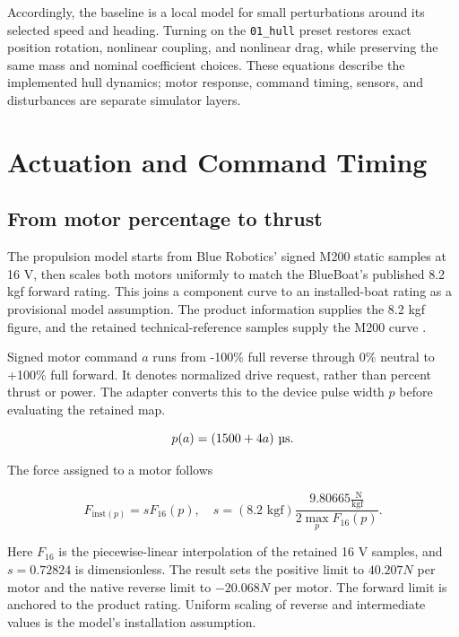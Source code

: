 \documentclass[10pt,letterpaper]{article}
\begin{document}
Accordingly, the baseline is a local model for small perturbations around its selected speed and heading. Turning on the \texttt{01\_hull} preset restores exact position rotation, nonlinear coupling, and nonlinear drag, while preserving the same mass and nominal coefficient choices. These equations describe the implemented hull dynamics; motor response, command timing, sensors, and disturbances are separate simulator layers.

\section{Actuation and Command Timing}\label{actuation-chapter}

\subsection{From motor percentage to thrust}

The propulsion model starts from Blue Robotics' signed M200 static samples at 16 V, then scales both motors uniformly to match the BlueBoat's published 8.2 kgf forward rating. This joins a component curve to an installed-boat rating as a provisional model assumption. The product information supplies the 8.2 kgf figure, and the retained technical-reference samples supply the M200 curve \cite{BlueRobotics2026M200Reference}\cite{BlueRobotics2026BlueBoatProduct}.

Signed motor command \(a\) runs from -100\% full reverse through 0\% neutral to +100\% full forward. It denotes normalized drive request, rather than percent thrust or power. The adapter converts this to the device pulse width \(p\) before evaluating the retained map.

\begin{equation}
p(a) = (1500 + 4a)\text{ \textmu{}s}.
\end{equation}

The force assigned to a motor follows

\begin{equation}
F_{\text{inst}(p)} = sF_{16}(p),\quad s = \left( 8.2\text{ kgf} \right)\frac{9.80665\frac{\text{ N}}{\text{kgf}}}{2\max\limits_{p}F_{16}(p)}.
\end{equation}

Here \(F_{16}\) is the piecewise-linear interpolation of the retained 16 V samples, and \(s = 0.72824\) is dimensionless. The result sets the positive limit to \(40.207N\) per motor and the native reverse limit to \(- 20.068N\) per motor. The forward limit is anchored to the product rating. Uniform scaling of reverse and intermediate values is the model's installation assumption.
\end{document}
